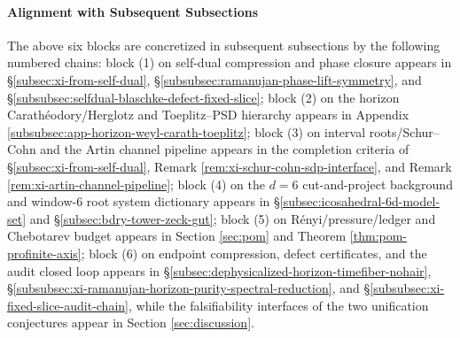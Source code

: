 \paragraph{Alignment with Subsequent Subsections}
The above six blocks are concretized in subsequent subsections by the following numbered chains: block (1) on self-dual compression and phase closure appears in \S\ref{subsec:xi-from-self-dual}, \S\ref{subsubsec:ramanujan-phase-lift-symmetry}, and \S\ref{subsubsec:selfdual-blaschke-defect-fixed-slice};
block (2) on the horizon Carath\'eodory/Herglotz and Toeplitz--PSD hierarchy appears in Appendix \ref{subsubsec:app-horizon-weyl-carath-toeplitz};
block (3) on interval roots/Schur--Cohn and the Artin channel pipeline appears in the completion criteria of \S\ref{subsec:xi-from-self-dual}, Remark \ref{rem:xi-schur-cohn-sdp-interface}, and Remark \ref{rem:xi-artin-channel-pipeline};
block (4) on the \(d=6\) cut-and-project background and window-6 root system dictionary appears in \S\ref{subsec:icosahedral-6d-model-set} and \S\ref{subsec:bdry-tower-zeck-gut};
block (5) on R\'enyi/pressure/ledger and Chebotarev budget appears in Section \ref{sec:pom} and Theorem \ref{thm:pom-profinite-axis};
block (6) on endpoint compression, defect certificates, and the audit closed loop appears in \S\ref{subsec:dephysicalized-horizon-timefiber-nohair}, \S\ref{subsubsec:xi-ramanujan-horizon-purity-spectral-reduction}, and \S\ref{subsubsec:xi-fixed-slice-audit-chain},
while the falsifiability interfaces of the two unification conjectures appear in Section \ref{sec:discussion}.


